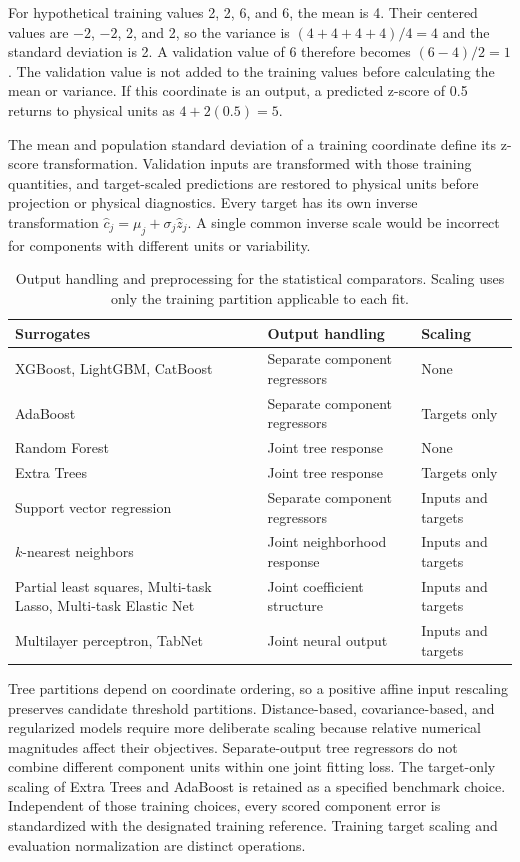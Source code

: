 For hypothetical training values 2, 2, 6, and 6, the mean is 4. Their centered values are $-2$, $-2$, 2, and 2, so the variance is $(4+4+4+4)/4=4$ and the standard deviation is 2. A validation value of 6 therefore becomes $(6-4)/2=1$. The validation value is not added to the training values before calculating the mean or variance. If this coordinate is an output, a predicted z-score of 0.5 returns to physical units as $4+2(0.5)=5$.

The mean and population standard deviation of a training coordinate define its z-score transformation. Validation inputs are transformed with those training quantities, and target-scaled predictions are restored to physical units before projection or physical diagnostics. Every target has its own inverse transformation $\widehat c_j=\mu_j+\sigma_j\widehat z_j$. A single common inverse scale would be incorrect for components with different units or variability.

\begin{table}[htbp]
\centering
\caption{Output handling and preprocessing for the statistical comparators. Scaling uses only the training partition applicable to each fit.}
\label{tab:surrogate_preprocessing}
\small
\begin{tabular}{p{5.1cm}p{3.2cm}p{3.3cm}}
\toprule
Surrogates & Output handling & Scaling\\
\midrule
XGBoost, LightGBM, CatBoost & Separate component regressors & None\\
AdaBoost & Separate component regressors & Targets only\\
Random Forest & Joint tree response & None\\
Extra Trees & Joint tree response & Targets only\\
Support vector regression & Separate component regressors & Inputs and targets\\
$k$-nearest neighbors & Joint neighborhood response & Inputs and targets\\
Partial least squares, Multi-task Lasso, Multi-task Elastic Net & Joint coefficient structure & Inputs and targets\\
Multilayer perceptron, TabNet & Joint neural output & Inputs and targets\\
\bottomrule
\end{tabular}
\end{table}

Tree partitions depend on coordinate ordering, so a positive affine input rescaling preserves candidate threshold partitions. Distance-based, covariance-based, and regularized models require more deliberate scaling because relative numerical magnitudes affect their objectives. Separate-output tree regressors do not combine different component units within one joint fitting loss. The target-only scaling of Extra Trees and AdaBoost is retained as a specified benchmark choice. Independent of those training choices, every scored component error is standardized with the designated training reference. Training target scaling and evaluation normalization are distinct operations.

